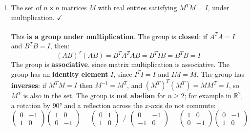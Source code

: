\documentclass{article}
\begin{document}
\begin{enumerate}
\begin{enumerate}
            \item The set of $n \times n$ matrices $M$ with real entries satisfying $M^TM = I$, under multiplication. $\checkmark$
            \\
            \\ This \textbf{is a group under multiplication}. The group is \textbf{closed}: if $A^TA = I$ and $B^TB = I$, then:
            \[
                (AB)^T(AB) = B^TA^TAB = B^TIB = B^TB = I
            \]
            The group is \textbf{associative}, since matrix multiplication is associative. The group has an \textbf{identity element} $I$, since $I^TI = I$ and $IM = M$. The group has \textbf{inverses}: if $M^TM=I$ then $M^{-1}=M^T$, and $(M^T)^T(M^T) = MM^T = I$, so $M^T$ is also in the set. The group is \textbf{not abelian} for $n \geq 2$; for example in $\mathbb{R}^2$, a rotation by $90°$ and a reflection across the $x$-axis do not commute:
            \[
                \begin{pmatrix}0&-1\\1&0\end{pmatrix}\begin{pmatrix}1&0\\0&-1\end{pmatrix}
                = \begin{pmatrix}0&1\\1&0\end{pmatrix}
                \neq
                \begin{pmatrix}0&-1\\-1&0\end{pmatrix}
                = \begin{pmatrix}1&0\\0&-1\end{pmatrix}\begin{pmatrix}0&-1\\1&0\end{pmatrix}
            \]


\end{enumerate}
\end{enumerate}
\end{document}
